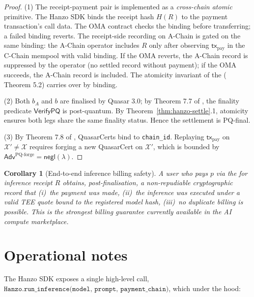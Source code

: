 \documentclass[11pt]{article}
\newtheorem{corollary}[theorem]{Corollary}
\begin{document}
\begin{proof}
(1) The receipt-payment pair is implemented as a
\emph{cross-chain atomic} primitive. The Hanzo SDK binds the receipt
hash $H(R)$ to the payment transaction's call data. The OMA contract
checks the binding before transferring; a failed binding reverts.
The receipt-side recording on A-Chain is gated on the same binding:
the A-Chain operator includes $R$ only after observing
$\mathsf{tx}_{\mathrm{pay}}$ in the C-Chain mempool with valid
binding. If the OMA reverts, the A-Chain record is suppressed by the
operator (no settled record without payment); if the OMA succeeds,
the A-Chain record is included. The atomicity invariant of the
 (\cite{lp-paper} Theorem 5.2) carries over by
binding.

(2) Both $b_A$ and $b$ are finalised by Quasar 3.0; by Theorem 7.7 of
\cite{quasar-cert}, the finality predicate
$\mathsf{VerifyPQ}$ is post-quantum. By
Theorem~\ref{thm:hanzo-settle}.1, atomicity ensures both legs share
the same finality status. Hence the settlement is PQ-final.

(3) By Theorem 7.8 of \cite{quasar-cert}, QuasarCerts bind to
\texttt{chain\_id}. Replaying $\mathsf{tx}_{\mathrm{pay}}$ on
$\mathcal{X}' \neq \mathcal{X}$ requires forging a new QuasarCert on
$\mathcal{X}'$, which is bounded by
$\mathsf{Adv}^{\mathrm{PQ\text{-}forge}} = \mathsf{negl}(\lambda)$.
\end{proof}

\begin{corollary}[End-to-end inference billing safety]
\label{cor:billing}
A user who pays $p$ via the  for inference receipt
$R$ obtains, post-finalisation, a non-repudiable cryptographic record
that (i)~the payment was made, (ii)~the inference was executed under
a valid TEE quote bound to the registered model hash, (iii)~no
duplicate billing is possible.  This is the strongest billing
guarantee currently available in the AI compute marketplace.
\end{corollary}

\section{Operational notes}
\label{sec:ops}

The Hanzo SDK exposes a single high-level call,
$\texttt{Hanzo.run\_inference(model, prompt, payment\_chain)}$, which
under the hood:
\end{document}
